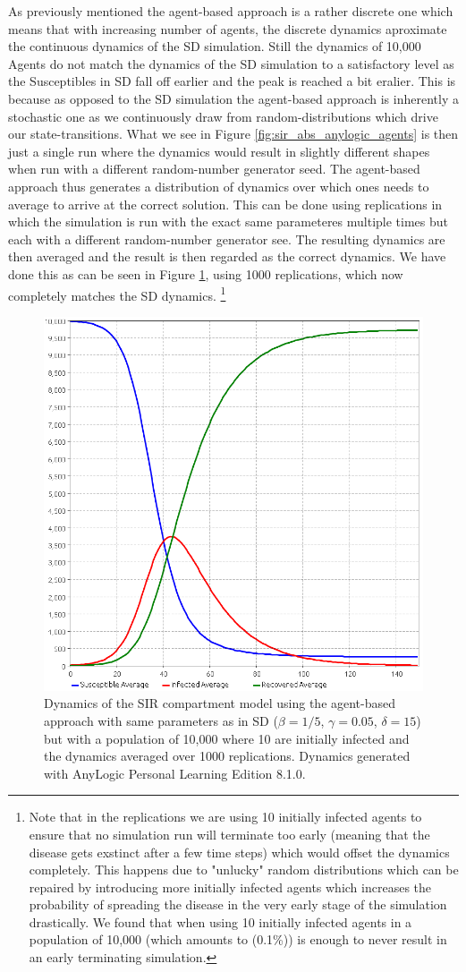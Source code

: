 As previously mentioned the agent-based approach is a rather discrete one which means that with increasing number of agents, the discrete dynamics aproximate the continuous dynamics of the SD simulation. Still the dynamics of 10,000 Agents do not match the dynamics of the SD simulation to a satisfactory level as the Susceptibles in SD fall off earlier and the peak is reached a bit eralier. This is because as opposed to the SD simulation the agent-based approach is inherently a stochastic one as we continuously draw from random-distributions which drive our state-transitions. What we see in Figure \ref{fig:sir_abs_anylogic_agents} is then just a single run where the dynamics would result in slightly different shapes when run with a different random-number generator seed. The agent-based approach thus generates a distribution of dynamics over which ones needs to average to arrive at the correct solution. This can be done using replications in which the simulation is run with the exact same parameteres multiple times but each with a different random-number generator see. The resulting dynamics are then averaged and the result is then regarded as the correct dynamics. We have done this as can be seen in Figure \ref{fig:sir_abs_anylogic_agents_repls}, using 1000 replications, which now completely matches the SD dynamics. \footnote{Note that in the replications we are using 10 initially infected agents to ensure that no simulation run will terminate too early (meaning that the disease gets exstinct after a few time steps) which would offset the dynamics completely. This happens due to "unlucky" random distributions which can be repaired by introducing more initially infected agents which increases the probability of spreading the disease in the very early stage of the simulation drastically. We found that when using 10 initially infected agents in a population of 10,000 (which amounts to (0.1\%)) is enough to never result in an early terminating simulation.}

\begin{figure}
	\centering
	\includegraphics[width=.4\textwidth, angle=0]{./fig/SIR_ABS_ANYLOGIC_10000Agents_10Init_1000Repls.png}
	\caption{Dynamics of the SIR compartment model using the agent-based approach with same parameters as in SD ($\beta = 1/5$, $\gamma = 0.05$, $\delta = 15$) but with a population of 10,000 where 10 are initially infected and the dynamics averaged over 1000 replications. Dynamics generated with AnyLogic Personal Learning Edition 8.1.0.}
	\label{fig:sir_abs_anylogic_agents_repls}
\end{figure}

